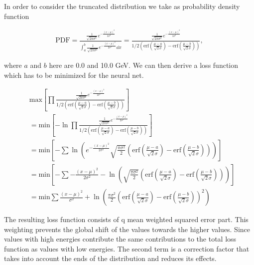 \documentclass[12pt, a4paper]{thesis}
\begin{document}
In order to consider the truncated distribution we take as probability density function 

\begin{align}
\text{PDF} = \frac{\frac{1}{\sqrt{2\pi \sigma^2}} e^{-\frac{(x-\mu)^2}{2 \sigma^2}}}{\int^b_a \frac{1}{\sqrt{2\pi \sigma^2}} e^{-\frac{(x-\mu)^2}{2 \sigma^2}} \dd x} = \frac{\frac{1}{\sqrt{2\pi \sigma^2}} e^{-\frac{(x-\mu)^2}{2 \sigma^2}}}{1/2\left(\text{erf}\left(\frac{\mu-a}{\sqrt{2}\sigma}\right) - \text{erf}\left(\frac{\mu-b}{\sqrt{2}\sigma}\right)\right)},
\end{align}

where \(a\) and \(b\) here are 0.0 and 10.0 GeV. We can then derive a loss
function which has to be minimized for the neural net.

\begin{align}
&\text{max}\left[ \prod \frac{\frac{1}{\sqrt{2\pi \sigma^2}} e^{-\frac{(x-\mu)^2}{2 \sigma^2}}}{1/2\left(\text{erf}\left(\frac{\mu-a}{\sqrt{2}\sigma}\right) - \text{erf}\left(\frac{\mu-b}{\sqrt{2}\sigma}\right)\right)} \right]\\
&=\text{min}\left[ -\ln \prod \frac{\frac{1}{\sqrt{2\pi \sigma^2}} e^{-\frac{(x-\mu)^2}{2 \sigma^2}}}{1/2\left(\text{erf}\left(\frac{\mu-a}{\sqrt{2}\sigma}\right) - \text{erf}\left(\frac{\mu-b}{\sqrt{2}\sigma}\right)\right)}\right] \\
&=\text{min}\left[ -\sum \ln(e^{-\frac{(x-\mu)^2}{2 \sigma^2}}{\sqrt{\frac{\pi \sigma^2}{2}}\left(\text{erf}\left(\frac{\mu-a}{\sqrt{2}\sigma}\right) - \text{erf}\left(\frac{\mu-b}{\sqrt{2}\sigma}\right)\right)})\right] \\
&=\text{min}\left[ -\sum -\frac{(x-\mu)^2}{2 \sigma^2}-\ln(\sqrt{\frac{\pi \sigma^2}{2}}\left(\text{erf}\left(\frac{\mu-a}{\sqrt{2}\sigma}\right) - \text{erf}\left(\frac{\mu-b}{\sqrt{2}\sigma}\right)\right))\right] \\
&=\text{min}  \sum \frac{(x-\mu)^2}{\sigma^2} + \ln(\frac{\pi \sigma^2}{2}\left(\text{erf}\left(\frac{\mu-a}{\sqrt{2}\sigma}\right) - \text{erf}\left(\frac{\mu-b}{\sqrt{2}\sigma}\right)\right)^2) \label{likelihood-loss}
\end{align}

The resulting loss function consists of q mean weighted squared error
part. This weighting prevents the global shift of the values towards
the higher values. Since values with high energies contribute the same
contributions to the total loss function as values with low
energies. The second term is a correction factor that takes into
account the ends of the distribution and reduces its effects.
\end{document}
